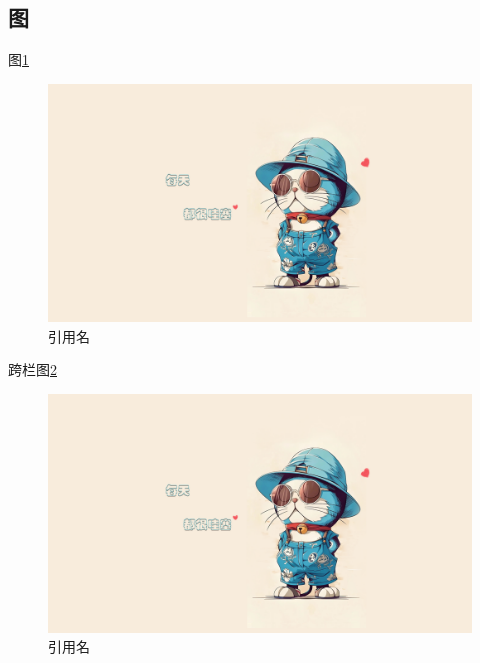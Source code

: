 \documentclass{template} %
\begin{document}
\begin{multicols}{2}
\subsection{图}
图\ref{图注}
\begin{figure}[H]
    \centering
    \includegraphics[width=0.8\linewidth]{demo.jpg}
    \caption{引用名}
    \label{图注}
\end{figure}


\end{multicols}


跨栏图\ref{图注2}
\begin{figure}[H]
    \centering
    \includegraphics[width=0.8\linewidth]{demo.jpg}
    \caption{引用名}
    \label{图注2}
\end{figure}
\end{document}
